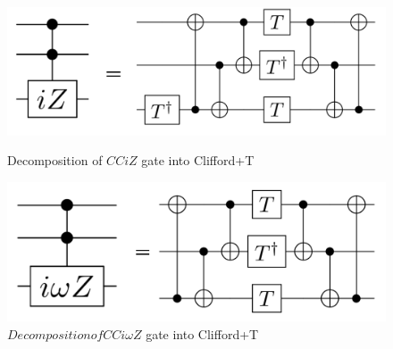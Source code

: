\begin{figure}[tbp]

\centering

\begin{minipage}[b]{0.49\columnwidth}

\centering

\includegraphics[width=0.9\columnwidth]{img/cciz.pdf}

\caption{Decomposition of $CCiZ$ gate into Clifford+T}

\label{cciz}

\end{minipage}

\begin{minipage}[b]{0.49\columnwidth}

\centering

\includegraphics[width=0.9\columnwidth]{img/cciomegaz.pdf}

\caption{$Decomposition of CCi\omega Z$ gate into Clifford+T}
\label{cciomegaz}
\end{minipage}
\end{figure}

